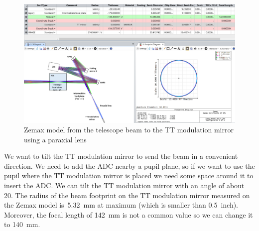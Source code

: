 \documentclass[12pt,a4paper]{article}
\begin{document}
\begin{figure}[H]
	\begin{center}
		\includegraphics[width=\textwidth]{images/Zemax_model_FP_TTmod_noTilt.PNG}
		\caption{Zemax model from the telescope beam to the TT modulation mirror using a paraxial lens}\label{fig:Zemax_model_FP_TTmod_noTilt}
	\end{center}
\end{figure}
We want to tilt the TT modulation mirror to send the beam in a convenient direction. We need to add the ADC nearby a pupil plane, so if we want to use the pupil where the TT modulation mirror is placed we need some space around it to insert the ADC. We can tilt the TT modulation mirror with an angle of about 20\degree. The radius of the beam footprint on the TT modulation mirror measured on the Zemax model is~5.32~mm at maximum (which is smaller than 0.5~inch).\\
Moreover, the focal length of 142~mm is not a common value so we can change it to 140~mm.\\
\end{document}

